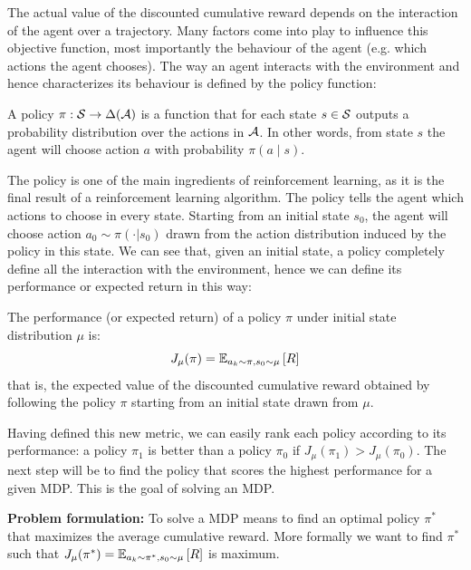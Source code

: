 The actual value of the discounted cumulative reward depends on the interaction of the agent over a trajectory. Many factors come into play to influence this objective function, most importantly the behaviour of the agent (e.g. which actions the agent chooses). The way an agent interacts with the environment and hence characterizes its behaviour is defined by the policy function:
\begin{definition}
A policy $\pi: \sspace \rightarrow \Delta (\aspace)$ is a function that for each state $s \in \sspace$ outputs a probability distribution over the actions in $\aspace$. In other words, from state $s$ the agent will choose action $a$ with probability $\pi(a \mid s)$.
\end{definition}

The policy is one of the main ingredients of reinforcement learning, as it is the final result of a reinforcement learning algorithm. The policy tells the agent which actions to choose in every state.
Starting from an initial state $s_0$, the agent will choose action $a_0 \sim \pi(\cdot | s_0)$ drawn from the action distribution induced by the policy in this state. We can see that, given an initial state, a policy completely define all the interaction with the environment, hence we can define its performance or expected return in this way:
\begin{definition}
The performance (or expected return) of a policy $\pi$ under initial state distribution $\mu$ is:
\[
J_\mu(\pi) = \EV[a_k \sim \pi, s_0 \sim \mu]{R}
\]
that is, the expected value of the discounted cumulative reward obtained by following the policy $\pi$ starting from an initial state drawn from $\mu$.
\end{definition}
Having defined this new metric, we can easily rank each policy according to its performance: a policy $\pi_1$ is better than a policy $\pi_0$ if $J_\mu(\pi_1) > J_\mu(\pi_0)$. The next step will be to find the policy that scores the highest performance for a given MDP. This is the goal of solving an MDP.

\textbf{Problem formulation:}\quad
To solve a MDP means to find an optimal policy $\pi^*$ that maximizes the average cumulative reward. More formally we want to find $\pi^*$ such that $J_\mu(\pi^*)=\EV[a_k \sim \pi^*, s_0 \sim \mu]{R}$ is maximum.

